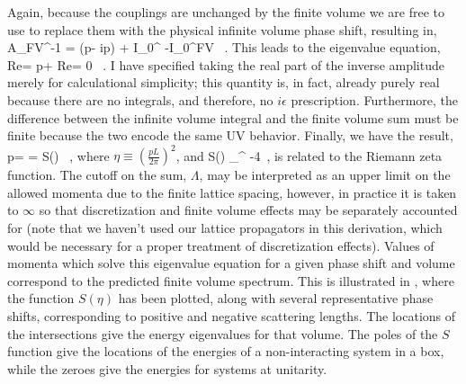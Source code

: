 Again, because the couplings are unchanged by the finite volume we are free to use  to replace them with the physical infinite volume phase shift, resulting in,
\beq
A_{\mbox{\tiny FV}}^{-1} = (p\cot\delta - ip) + I_0^{\infty} -I_0^{\mbox{\tiny FV}} \ .
\eeq
This leads to the eigenvalue equation,
\beq
\mbox{Re}= p\cot\delta + \mbox{Re} = 0 \ .
\eeq
I have specified taking the real part of the inverse amplitude merely for calculational simplicity; this quantity is, in fact, already purely real because there are no integrals, and therefore, no $i\epsilon$ prescription. Furthermore, the difference between the infinite volume integral and the finite volume sum must be finite because the two encode the same UV behavior. Finally, we have the result,
\beq
\label{eq:pcotdeltaeig}
p\cot\delta =  = S(\eta) \ ,
\eeq
where $\eta \equiv \left(\frac{pL}{2\pi}\right)^2$, and
\beq
S(\eta) \equiv \sum_{}^{\Lambda}  -4\pi \Lambda \ ,
\eeq
is related to the Riemann zeta function. The cutoff on the sum, $\Lambda$, may be interpreted as an upper limit on the allowed momenta due to the finite lattice spacing, however, in practice it is taken to $\infty$ so that discretization and finite volume effects may be separately accounted for (note that we haven't used our lattice propagators in this derivation, which would be necessary for a proper treatment of discretization effects). Values of momenta which solve this eigenvalue equation for a given phase shift and volume correspond to the predicted finite volume spectrum. This is illustrated in , where the function $S(\eta)$ has been plotted, along with several representative phase shifts, corresponding to positive and negative scattering lengths. The locations of the intersections give the energy eigenvalues for that volume. The poles of the $S$ function give the locations of the energies of a non-interacting system in a box, while the zeroes give the energies for systems at unitarity. 

